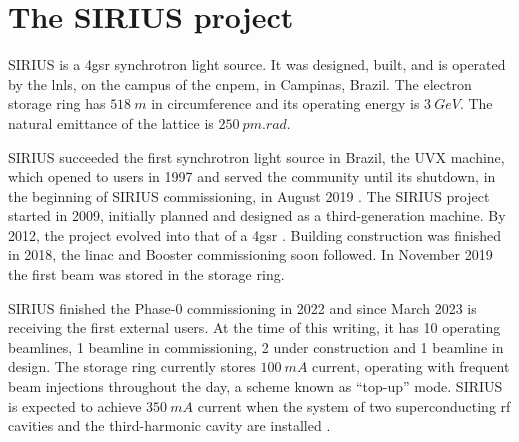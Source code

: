 \section*{The SIRIUS project}

SIRIUS is a \gls*{4gsr} synchrotron light source. It was designed, built, and is operated by the \gls*{lnls}, on the campus of the \gls*{cnpem}, in Campinas, Brazil. The electron storage ring has $518~\unit{m}$ in circumference and its operating energy is $3~\unit{GeV}$. The natural emittance of the lattice is $250~\unit{pm}.\unit{rad}$. 

SIRIUS succeeded the first synchrotron light source in Brazil, the UVX machine, which opened to users in 1997 and served the community until its shutdown, in the beginning of SIRIUS commissioning, in August 2019
\cite{liu_synchrotron_2019}. The SIRIUS project started in 2009, initially planned and designed as a third-generation machine. By 2012, the project evolved into that of a \gls*{4gsr} \cite{liu_synchrotron_2019}. Building construction was finished in 2018, the \acrshort*{linac} and Booster commissioning soon followed. In November 2019 the first beam was stored in the storage ring.

SIRIUS finished the Phase-0 commissioning in 2022 and since March 2023 is receiving the first external users. At the time of this writing,  it has 10 operating beamlines, 1 beamline in commissioning, 2 under construction and 1 beamline in design\cite{lnls_beamlines}. The storage ring currently stores $100~\unit{mA}$ current, operating with frequent beam injections throughout the day, a scheme known as ``top-up'' mode. SIRIUS is expected to achieve $350~\unit{mA}$ current when the system of two superconducting \gls*{rf} cavities and the third-harmonic cavity are installed \cite{liu_status_2022,liu_status_2023}.

